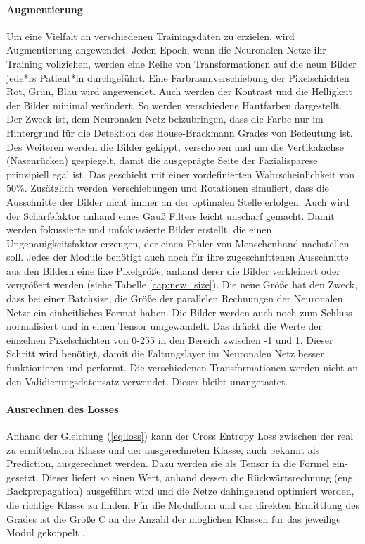 \paragraph{Augmentierung} Um eine Vielfalt an verschiedenen Trainingsdaten zu erzielen, wird Augmentierung angewendet. Jeden Epoch, wenn die Neuronalen Netze ihr Training vollziehen, werden eine Reihe von Transformationen auf die neun Bilder jede*rs Patient*in durchgeführt. Eine Farbraumverschiebung der Pixelschichten Rot, Grün, Blau wird angewendet. Auch werden der Kontrast und die Helligkeit der Bilder minimal verändert. So werden verschiedene Hautfarben dargestellt. Der Zweck ist, dem Neuronalen Netz beizubringen, dass die Farbe nur im Hintergrund für die Detektion des House-Brackmann Grades von Bedeutung ist. Des Weiteren werden die Bilder gekippt, verschoben und um die Vertikalachse (Nasenrücken) gespiegelt, damit die ausgeprägte Seite der Fazialisparese prinzipiell egal ist. Das geschieht mit einer vordefinierten Wahrscheinlichkeit von 50\%. Zusätzlich werden Verschiebungen und Rotationen simuliert, dass die Ausschnitte der Bilder nicht immer an der optimalen Stelle erfolgen. Auch wird der Schärfefaktor anhand eines Gauß Filters leicht unscharf gemacht. Damit werden fokussierte und unfokussierte Bilder erstellt, die einen Ungenauigkeitsfaktor erzeugen, der einen Fehler von Menschenhand nachstellen soll. Jedes der Module benötigt auch noch für ihre zugeschnittenen Ausschnitte aus den Bildern eine fixe Pixelgröße, anhand derer die Bilder verkleinert oder vergrößert werden  (siehe Tabelle \ref{cap:new_size}). Die neue Größe hat den Zweck, dass bei einer Batchsize, die Größe der parallelen Rechnungen der Neuronalen Netze ein einheitliches Format haben. Die Bilder werden auch noch zum Schluss normalisiert und in einen Tensor umgewandelt. Das drückt die Werte der einzelnen Pixelschichten von 0-255 in den Bereich zwischen -1 und 1. Dieser Schritt wird benötigt, damit die Faltungslayer im Neuronalen Netz besser funktionieren und performt. Die verschiedenen Transformationen werden nicht an den Validierungsdatensatz verwendet. Dieser bleibt unangetastet.

\clearpage
\paragraph{Ausrechnen des Losses} Anhand der Gleichung (\ref{eq:loss}) kann der Cross Entropy Loss zwischen der real zu ermittelnden Klasse und der ausgerechneten Klasse, auch bekannt als Prediction, ausgerechnet werden. Dazu werden sie als Tensor in die Formel ein- gesetzt. Dieser liefert so einen Wert, anhand dessen die Rückwärtsrechnung (eng. Backpropagation) ausgeführt wird und die Netze dahingehend optimiert werden, die richtige Klasse zu finden. Für die Modulform und der direkten Ermittlung des Grades ist die Größe C an die Anzahl der möglichen Klassen für das jeweilige Modul gekoppelt \cite{pytorch}.

